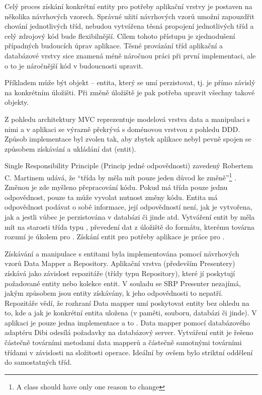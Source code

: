 Celý proces získání konkrétní entity pro potřeby aplikační vrstvy je postaven na několika návrhových vzorech. Správné užití návrhových vzorů umožní zapouzdřit chování jednotlivých tříd, nebudou vytvářena těsná propojení jednotlivých tříd a celý zdrojový kód bude flexibilnější. Cílem tohoto přístupu je zjednodušení případných budoucích úprav aplikace. Těsné provázání tříd aplikační a databázové vrstvy sice znamená méně náročnou práci při první implementaci, ale o to je náročnější kód v budoucnosti upravit. 

Příkladem může být objekt -- entita, který se umí perzistovat, tj. je přímo závislý na konkrétním úložišti. Při změně úložiště je pak potřeba upravit všechny takové objekty.

Z pohledu architektury MVC reprezentuje modelová vrstva data a manipulaci s nimi a v aplikaci se výrazně překrývá s doménovou vrstvou z pohledu DDD. Způsob implementace byl zvolen tak, aby zbytek aplikace nebyl pevně spojen se způsobem získávání a ukládání dat (entit).

Single Responsibility Principle (Princip jedné odpovědnosti) zavedený Robertem C. Martinem udává, že ``třída by měla mít pouze jeden důvod ke změně''\footnote{A class should have only one reason to change\cite{Martin2002}} . Změnou je zde myšleno přepracování kódu. Pokud má třída pouze jednu odpovědnost, pouze ta může vyvolat nutnost změny kódu. Entita má odpovědnost podávat o sobě informace, její odpovědností není, jak je vytvořena, jak a jestli vůbec je perzistována v databázi či jinde atd. Vytváření entit by měla mít na starosti třída typu , převedení dat z úložiště do formátu, kterému továrna rozumí je úkolem pro . Získání entit pro potřeby aplikace je práce pro . 

Získávání a manipulace s entitami byla implementována pomocí návrhových vzorů Data Mapper a Repository. Aplikační vrstva (především Presentery) získává jako závislost repozitáře (třídy typu Repository), které jí poskytují požadované entity nebo kolekce entit. V souladu se SRP Presenter nezajímá, jakým způsobem jsou entity získávány, k jeho odpovědnosti to nepatří. Repozitáře vědí, že rozhraní Data mapper umí poskytovat entity bez ohledu na to, kde a jak je konkrétní entita uložena (v paměti, souboru, databázi či jinde). V aplikaci je pouze jedna implementace a to . Data mapper pomocí databázového adaptéru Dibi odesílá požadavky na databázový server. Vytváření entit je řešeno částečně továrními metodami data mapperů a částečně samotnými továrními třídami v závislosti na složitosti operace. Ideální by ovšem bylo striktní oddělení do samostatných tříd.
\clearpage

